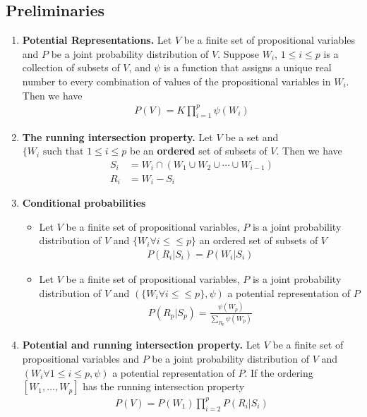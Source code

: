 \documentclass[12pt,twoside]{article}
\begin{document}
\subsection{Preliminaries}
\begin{enumerate}
	\item \textbf{Potential Representations.} Let $V$ be a finite set of propositional variables and $P$ be a joint probability distribution of $V$. Suppose  $W_i$, $1 \leq i \leq p$  is a collection of subsets of $V$, and $\psi$ is a function that assigns a unique real number to every combination of values of the propositional variables in $W_i$. Then we have
	\begin{align*}
		P(V) = K \prod_{i=1}^p \psi(W_i)
	\end{align*}		
	

	
	\item \textbf{The running intersection property.} Let $V$ be a set and  $\lbrace W_i \text{ such that } 1 \leq i \leq p$ be an \textbf{ordered} set of subsets of $V$. Then we have
	\begin{align*}
		S_i &= W_i \cap (W_1\cup W_2\cup \cdots \cup W_{i-1})\\
		R_i & = W_i - S_i
	\end{align*}

	\item \textbf{Conditional probabilities} 
		\begin{itemize}	
			\item Let $V$ be a finite set of propositional variables, $P$ is a joint probability distribution of $V$ and $\lbrace W_i \forall i \leq \leq p\rbrace$ an ordered set of subsets of $V$
				\begin{align*}
					P(R_i\vert S_i) = P(W_i \vert S_i)
				\end{align*}							
			
			\item Let $V$ be a finite set of propositional variables, $P$ is a joint probability distribution of $V$ and $(\lbrace W_i \forall i \leq \leq p\rbrace,\psi)$ a potential representation of $P$
				\begin{align*}
					P(R_p \vert S_p) =\frac{\psi(W_p)}{\sum_{R_p}\psi(W_p)}
				\end{align*}
			
		\end{itemize}
	
	\item \textbf{Potential and running intersection property.} Let $V$ be a finite set of propositional variables and $P$ be a joint probability distribution of $V$ and $(W_i \forall 1 \leq i \leq p, \psi)$  a potential representation of $P$. If the ordering $[W_1, \ldots, W_p]$ has the running intersection property
	\begin{align*}
		P(V) = P(W_1) \prod_{i=2}^p P(R_i\vert S_i)
	\end{align*}
\end{enumerate}
\end{document}
